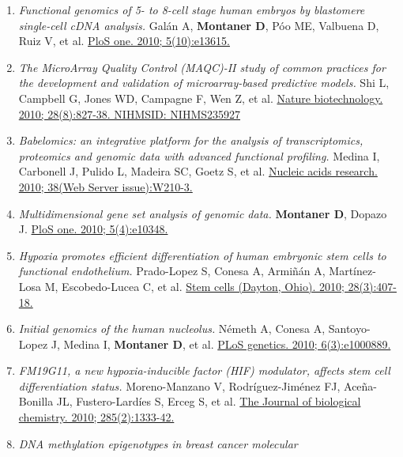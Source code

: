 \begin{enumerate}
{  macrophages modulates macrophage lipotoxicity and M2/M1 polarization
  in obese mice.} Prieur X, Mok CY, Velagapudi VR, Núñez V, Fuentes L,
  et al. \href{http://www.ncbi.nlm.nih.gov//pubmed/21266330}{Diabetes.
  2011; 60(3):797-809.}
\item
  \emph{Functional genomics of 5- to 8-cell stage human embryos by
  blastomere single-cell cDNA analysis.} Galán A, \textbf{Montaner D},
  Póo ME, Valbuena D, Ruiz V, et al.
  \href{http://www.ncbi.nlm.nih.gov//pubmed/21049019}{PloS one. 2010;
  5(10):e13615.}
\item
  \emph{The MicroArray Quality Control (MAQC)-II study of common
  practices for the development and validation of microarray-based
  predictive models.} Shi L, Campbell G, Jones WD, Campagne F, Wen Z, et
  al. \href{http://www.ncbi.nlm.nih.gov//pubmed/20676074}{Nature
  biotechnology. 2010; 28(8):827-38. NIHMSID: NIHMS235927}
\item
  \emph{Babelomics: an integrative platform for the analysis of
  transcriptomics, proteomics and genomic data with advanced functional
  profiling.} Medina I, Carbonell J, Pulido L, Madeira SC, Goetz S, et
  al. \href{http://www.ncbi.nlm.nih.gov//pubmed/20478823}{Nucleic acids
  research. 2010; 38(Web Server issue):W210-3.}
\item
  \emph{Multidimensional gene set analysis of genomic data.}
  \textbf{Montaner D}, Dopazo J.
  \href{http://www.ncbi.nlm.nih.gov//pubmed/20436964}{PloS one. 2010;
  5(4):e10348.}
\item
  \emph{Hypoxia promotes efficient differentiation of human embryonic
  stem cells to functional endothelium.} Prado-Lopez S, Conesa A,
  Armiñán A, Martínez-Losa M, Escobedo-Lucea C, et al.
  \href{http://www.ncbi.nlm.nih.gov//pubmed/20049902}{Stem cells
  (Dayton, Ohio). 2010; 28(3):407-18.}
\item
  \emph{Initial genomics of the human nucleolus.} Németh A, Conesa A,
  Santoyo-Lopez J, Medina I, \textbf{Montaner D}, et al.
  \href{http://www.ncbi.nlm.nih.gov//pubmed/20361057}{PLoS genetics.
  2010; 6(3):e1000889.}
\item
  \emph{FM19G11, a new hypoxia-inducible factor (HIF) modulator, affects
  stem cell differentiation status.} Moreno-Manzano V, Rodríguez-Jiménez
  FJ, Aceña-Bonilla JL, Fustero-Lardíes S, Erceg S, et al.
  \href{http://www.ncbi.nlm.nih.gov//pubmed/19897487}{The Journal of
  biological chemistry. 2010; 285(2):1333-42.}
\item
  \emph{DNA methylation epigenotypes in breast cancer molecular
}
\end{enumerate}
